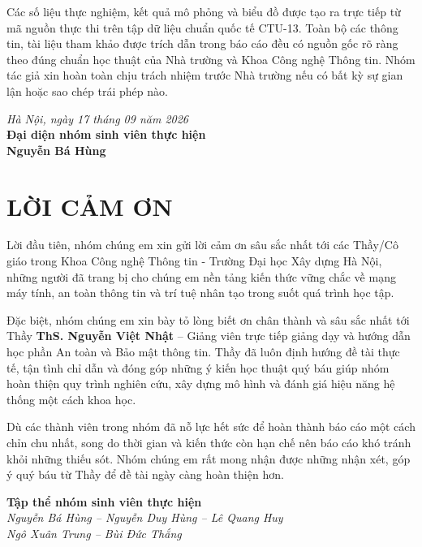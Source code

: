 \documentclass[12pt,a4paper,oneside]{report}
\begin{document}
Các số liệu thực nghiệm, kết quả mô phỏng và biểu đồ được tạo ra trực tiếp từ mã nguồn thực thi trên tập dữ liệu chuẩn quốc tế CTU-13. Toàn bộ các thông tin, tài liệu tham khảo được trích dẫn trong báo cáo đều có nguồn gốc rõ ràng theo đúng chuẩn học thuật của Nhà trường và Khoa Công nghệ Thông tin. Nhóm tác giả xin hoàn toàn chịu trách nhiệm trước Nhà trường nếu có bất kỳ sự gian lận hoặc sao chép trái phép nào.

\vspace{1.5cm}
\begin{flushright}
  \textit{Hà Nội, ngày 17 tháng 09 năm 2026}\\[0.3cm]
  \textbf{Đại diện nhóm sinh viên thực hiện}\\[1.5cm]
  \textbf{Nguyễn Bá Hùng}
\end{flushright}

\newpage
\chapter*{LỜI CẢM ƠN}
Lời đầu tiên, nhóm chúng em xin gửi lời cảm ơn sâu sắc nhất tới các Thầy/Cô giáo trong Khoa Công nghệ Thông tin - Trường Đại học Xây dựng Hà Nội, những người đã trang bị cho chúng em nền tảng kiến thức vững chắc về mạng máy tính, an toàn thông tin và trí tuệ nhân tạo trong suốt quá trình học tập.

Đặc biệt, nhóm chúng em xin bày tỏ lòng biết ơn chân thành và sâu sắc nhất tới Thầy \textbf{ThS. Nguyễn Việt Nhật} – Giảng viên trực tiếp giảng dạy và hướng dẫn học phần An toàn và Bảo mật thông tin. Thầy đã luôn định hướng đề tài thực tế, tận tình chỉ dẫn và đóng góp những ý kiến học thuật quý báu giúp nhóm hoàn thiện quy trình nghiên cứu, xây dựng mô hình và đánh giá hiệu năng hệ thống một cách khoa học.

Dù các thành viên trong nhóm đã nỗ lực hết sức để hoàn thành báo cáo một cách chỉn chu nhất, song do thời gian và kiến thức còn hạn chế nên báo cáo khó tránh khỏi những thiếu sót. Nhóm chúng em rất mong nhận được những nhận xét, góp ý quý báu từ Thầy để đề tài ngày càng hoàn thiện hơn.

\vspace{1.5cm}
\begin{flushright}
  \textbf{Tập thể nhóm sinh viên thực hiện}\\[0.5cm]
  \textit{Nguyễn Bá Hùng -- Nguyễn Duy Hùng -- Lê Quang Huy}\\
  \textit{Ngô Xuân Trung -- Bùi Đức Thắng}
\end{flushright}
\end{document}
